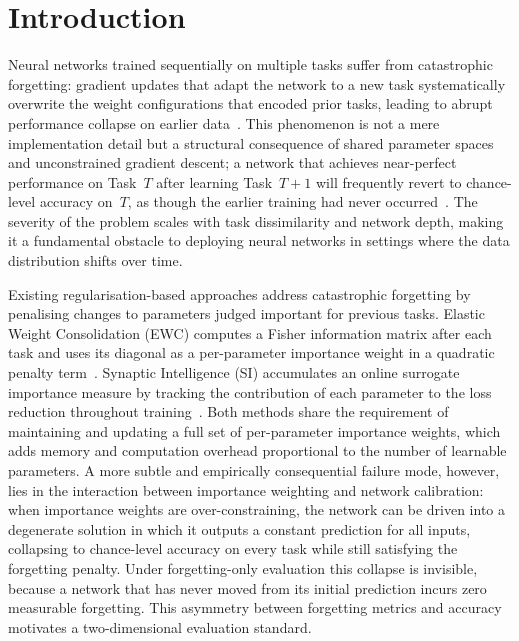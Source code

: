 \documentclass[10pt,a4paper]{article}
\begin{document}
\tableofcontents
\newpage

\section{Introduction}
\label{sec:introduction}

Neural networks trained sequentially on multiple tasks suffer from catastrophic
forgetting: gradient updates that adapt the network to a new task systematically
overwrite the weight configurations that encoded prior tasks, leading to abrupt
performance collapse on earlier data~\cite{McCloskey1989}.
This phenomenon is not a mere implementation detail but a structural consequence
of shared parameter spaces and unconstrained gradient descent; a network that
achieves near-perfect performance on Task~$T$ after learning Task~$T{+}1$ will
frequently revert to chance-level accuracy on~$T$, as though the earlier training
had never occurred~\cite{Kirkpatrick2017}.
The severity of the problem scales with task dissimilarity and network depth,
making it a fundamental obstacle to deploying neural networks in settings where
the data distribution shifts over time.

Existing regularisation-based approaches address catastrophic forgetting by
penalising changes to parameters judged important for previous tasks.
Elastic Weight Consolidation (EWC) computes a Fisher information matrix after
each task and uses its diagonal as a per-parameter importance weight in a
quadratic penalty term~\cite{Kirkpatrick2017}.
Synaptic Intelligence (SI) accumulates an online surrogate importance measure
by tracking the contribution of each parameter to the loss reduction throughout
training~\cite{Zenke2017}.
Both methods share the requirement of maintaining and updating a full set of
per-parameter importance weights, which adds memory and computation overhead
proportional to the number of learnable parameters.
A more subtle and empirically consequential failure mode, however, lies in the
interaction between importance weighting and network calibration: when importance
weights are over-constraining, the network can be driven into a degenerate
solution in which it outputs a constant prediction for all inputs, collapsing
to chance-level accuracy on every task while still satisfying the forgetting
penalty.
Under forgetting-only evaluation this collapse is invisible, because a network
that has never moved from its initial prediction incurs zero measurable forgetting.
This asymmetry between forgetting metrics and accuracy motivates a two-dimensional
evaluation standard.
\end{document}
